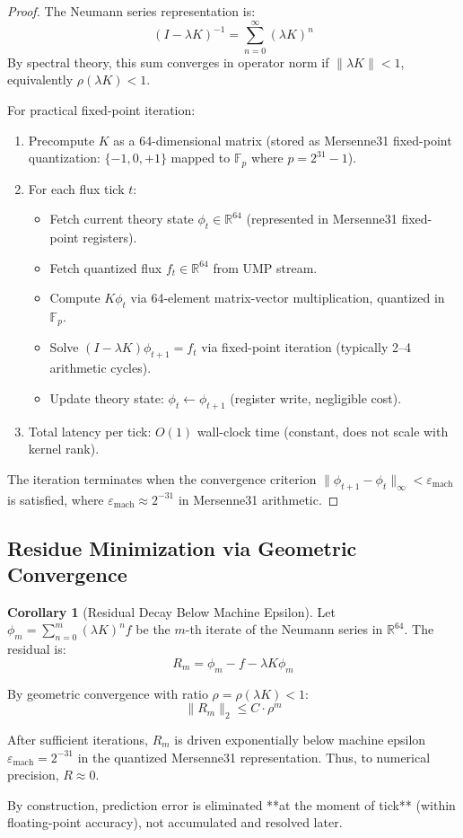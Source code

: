 \documentclass[11pt,oneside]{article}
\theoremstyle{definition}
\newtheorem{corollary}[theorem]{Corollary}
\begin{document}
\begin{proof}
The Neumann series representation is:
\[
(I - \lambda K)^{-1} = \sum_{n=0}^{\infty} (\lambda K)^n
\]
\noindent By spectral theory, this sum converges in operator norm if $\|\lambda K\| < 1$, equivalently $\rho(\lambda K) < 1$.

For practical fixed-point iteration:
\begin{enumerate}
  \item Precompute $K$ as a 64-dimensional matrix (stored as Mersenne31 fixed-point quantization: $\{-1, 0, +1\}$ mapped to $\mathbb{F}_p$ where $p = 2^{31}-1$).
  \item For each flux tick $t$:
  \begin{itemize}
    \item Fetch current theory state $\phi_t \in \mathbb{R}^{64}$ (represented in Mersenne31 fixed-point registers).
    \item Fetch quantized flux $f_t \in \mathbb{R}^{64}$ from UMP stream.
    \item Compute $K\phi_t$ via 64-element matrix-vector multiplication, quantized in $\mathbb{F}_p$.
    \item Solve $(I - \lambda K)\phi_{t+1} = f_t$ via fixed-point iteration (typically 2--4 arithmetic cycles).
    \item Update theory state: $\phi_t \gets \phi_{t+1}$ (register write, negligible cost).
  \end{itemize}
  \item Total latency per tick: $O(1)$ wall-clock time (constant, does not scale with kernel rank).
\end{enumerate}
The iteration terminates when the convergence criterion $\|\phi_{t+1} - \phi_t\|_{\infty} < \varepsilon_{\text{mach}}$ is satisfied, where $\varepsilon_{\text{mach}} \approx 2^{-31}$ in Mersenne31 arithmetic.
\end{proof}

\subsection{Residue Minimization via Geometric Convergence}

\begin{corollary}[Residual Decay Below Machine Epsilon]
Let $\phi_m = \sum_{n=0}^{m} (\lambda K)^n f$ be the $m$-th iterate of the Neumann series in $\mathbb{R}^{64}$. The residual is:
\[
R_m = \phi_m - f - \lambda K\phi_m
\]

By geometric convergence with ratio $\rho = \rho(\lambda K) < 1$:
\[
\|R_m\|_2 \leq C \cdot \rho^m
\]

After sufficient iterations, $R_m$ is driven exponentially below machine epsilon $\varepsilon_{\text{mach}} = 2^{-31}$ in the quantized Mersenne31 representation. Thus, to numerical precision, $R \approx 0$.

By construction, prediction error is eliminated **at the moment of tick** (within floating-point accuracy), not accumulated and resolved later.
\end{corollary}
\end{document}
